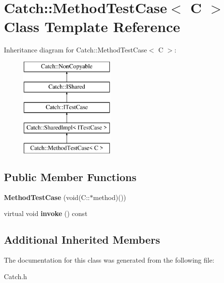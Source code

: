 \hypertarget{class_catch_1_1_method_test_case}{\section{Catch\-:\-:Method\-Test\-Case$<$ C $>$ Class Template Reference}
\label{class_catch_1_1_method_test_case}
}
Inheritance diagram for Catch\-:\-:Method\-Test\-Case$<$ C $>$\-:\begin{figure}[H]
\begin{center}
\leavevmode
\includegraphics[height=5.000000cm]{class_catch_1_1_method_test_case}
\end{center}
\end{figure}
\subsection*{Public Member Functions}
\begin{DoxyCompactItemize}
\item 
\hypertarget{class_catch_1_1_method_test_case_a7b043b85dae371358255dd9dc6582e7b}{{\bfseries Method\-Test\-Case} (void(C\-::$\ast$method)())}\label{class_catch_1_1_method_test_case_a7b043b85dae371358255dd9dc6582e7b}

\item 
\hypertarget{class_catch_1_1_method_test_case_a39cc4b760dd71adc3f7550bc1e7eb697}{virtual void {\bfseries invoke} () const }\label{class_catch_1_1_method_test_case_a39cc4b760dd71adc3f7550bc1e7eb697}

\end{DoxyCompactItemize}
\subsection*{Additional Inherited Members}


The documentation for this class was generated from the following file\-:\begin{DoxyCompactItemize}
\item 
Catch.\-h\end{DoxyCompactItemize}
